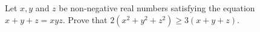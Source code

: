 Let $x,y$ and $z$ be non-negative real numbers satisfying the equation $x+y+z=xyz$. Prove that $2(x^2+y^2+z^2)\geq3(x+y+z)$.